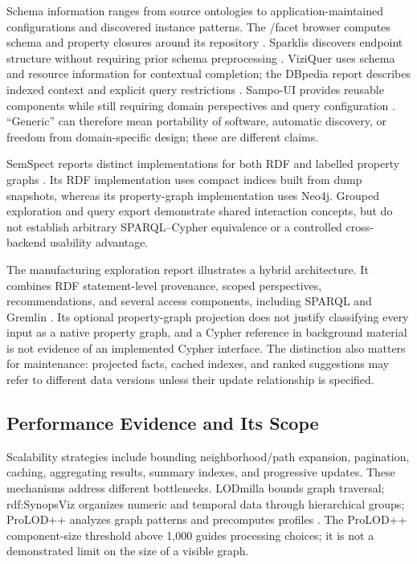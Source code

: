 \documentclass[manuscript,review,screen]{acmart}
\begin{document}
Schema information ranges from source ontologies to application-maintained configurations and discovered instance patterns. The /facet browser computes schema and property closures around its repository \citep{2006_Hildebrand_facet_A}. Sparklis discovers endpoint structure without requiring prior schema preprocessing \citep{2017_Ferre_Sparklis_An}. ViziQuer uses schema and resource information for contextual completion; the DBpedia report describes indexed context and explicit query restrictions \citep{V3-01013}. Sampo-UI provides reusable components while still requiring domain perspectives and query configuration \citep{2022_Ikkala_Sampo-UI_A}. ``Generic'' can therefore mean portability of software, automatic discovery, or freedom from domain-specific design; these are different claims.

SemSpect reports distinct implementations for both RDF and labelled property graphs \citep{V3-02383}. Its RDF implementation uses compact indices built from dump snapshots, whereas its property-graph implementation uses Neo4j. Grouped exploration and query export demonstrate shared interaction concepts, but do not establish arbitrary SPARQL--Cypher equivalence or a controlled cross-backend usability advantage.

The manufacturing exploration report illustrates a hybrid architecture. It combines RDF statement-level provenance, scoped perspectives, recommendations, and several access components, including SPARQL and Gremlin \citep{V3-00949}. Its optional property-graph projection does not justify classifying every input as a native property graph, and a Cypher reference in background material is not evidence of an implemented Cypher interface. The distinction also matters for maintenance: projected facts, cached indexes, and ranked suggestions may refer to different data versions unless their update relationship is specified.

\subsection{Performance Evidence and Its Scope}
Scalability strategies include bounding neighborhood/path expansion, pagination, caching, aggregating results, summary indexes, and progressive updates. These mechanisms address different bottlenecks. LODmilla bounds graph traversal; rdf:SynopsViz organizes numeric and temporal data through hierarchical groups; ProLOD++ analyzes graph patterns and precomputes profiles \citep{2014_AMA_LODmilla_Shared,2014_Bikakis_rdfSynopsViz_a,V3-01058}. The ProLOD++ component-size threshold above 1,000 guides processing choices; it is not a demonstrated limit on the size of a visible graph.
\end{document}

